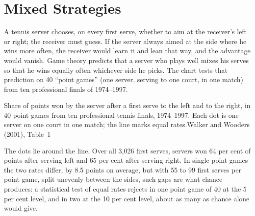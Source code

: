 \chapter{Mixed Strategies}\label{ch:b2:mixed-strategies}

A tennis server chooses, on every first serve, whether to aim at the receiver's left or right; the
receiver must guess. If the server always aimed at the side where he wins more often, the receiver would
learn it and lean that way, and the advantage would vanish. Game theory predicts that a server who plays
well mixes his serves so that he wins equally often whichever side he picks. The chart tests that
prediction on 40 ``point games'' (one server, serving to one court, in one match) from ten professional
finals of 1974--1997.

\begin{openingchart}{Share of points won by the server after a first serve to the left and to the right,
  in 40 point games from ten professional tennis finals, 1974--1997. Each dot is one server on one court in
  one match; the line marks equal rates.}{Walker and Wooders (2001), Table~1}
\end{openingchart}

The dots lie around the line. Over all 3{,}026 first serves, servers won 64 per cent of points after serving
left and 65 per cent after serving right. In single point games the two rates differ, by 8.5 points on
average, but with 55 to 99 first serves per point game, split unevenly between the sides, such gaps are what chance
produces: a statistical test of equal
rates rejects in one point game of 40 at the 5 per cent level, and in two at the 10 per cent level, about as
many as chance alone would give.

